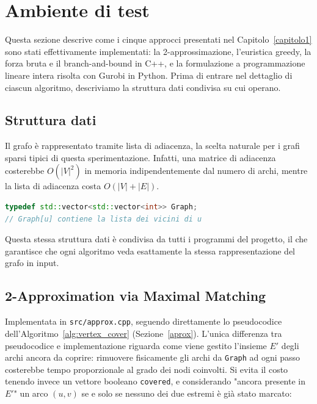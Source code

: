 \chapter{Ambiente di test}


Questa sezione descrive come i cinque approcci presentati nel Capitolo~\ref{capitolo1} sono stati effettivamente implementati: la 2-approssimazione, l'euristica greedy, la forza bruta e il branch-and-bound in C++, e la formulazione a programmazione lineare intera risolta con Gurobi in Python. Prima di entrare nel dettaglio di ciascun algoritmo, descriviamo la struttura dati condivisa su cui operano.

\section{Struttura dati}

Il grafo è rappresentato tramite lista di adiacenza, 
la scelta naturale per i grafi sparsi tipici di questa sperimentazione. 
Infatti, una matrice di adiacenza costerebbe $O(|V|^2)$ in memoria indipendentemente 
dal numero di archi, mentre la lista di adiacenza costa $O(|V|+|E|)$.

\begin{lstlisting}[language=C++, caption={Rappresentazione del grafo, condivisa da tutti gli algoritmi (\texttt{data/graph.h})}]
typedef std::vector<std::vector<int>> Graph;
// Graph[u] contiene la lista dei vicini di u
\end{lstlisting}

Questa stessa struttura dati è condivisa da 
tutti i programmi del progetto, il che garantisce che ogni algoritmo veda esattamente 
la stessa rappresentazione del grafo in input.

\section{2-Approximation via Maximal Matching}

Implementata in \texttt{src/approx.cpp}, seguendo direttamente lo pseudocodice dell'Algoritmo~\ref{alg:vertex_cover} (Sezione~\ref{aprox}). 
L'unica differenza tra pseudocodice e implementazione riguarda come viene gestito l'insieme $E'$ degli archi ancora da coprire: rimuovere fisicamente gli archi da \texttt{Graph} ad ogni passo costerebbe tempo proporzionale al grado dei nodi coinvolti. Si evita il costo tenendo invece un vettore booleano \texttt{covered}, e considerando "ancora presente in $E'$" un arco $(u,v)$ se e solo se nessuno dei due estremi è già stato marcato:

